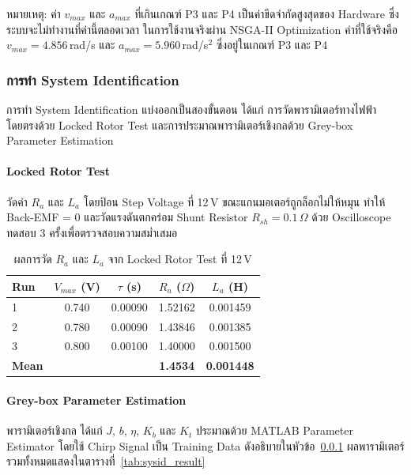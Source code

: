 หมายเหตุ: ค่า $v_{max}$ และ $a_{max}$ ที่เกินเกณฑ์ P3 และ P4
เป็นค่าขีดจำกัดสูงสุดของ Hardware ซึ่งระบบจะไม่ทำงานที่ค่านี้ตลอดเวลา
ในการใช้งานจริงผ่าน NSGA-II Optimization
ค่าที่ใช้จริงคือ $v_{max} = 4.856$\,rad/s และ $a_{max} = 5.960$\,rad/s$^2$
ซึ่งอยู่ในเกณฑ์ P3 และ P4

\subsubsection{การทำ System Identification}
\label{subsec:sysid}

การทำ System Identification แบ่งออกเป็นสองขั้นตอน
ได้แก่ การวัดพารามิเตอร์ทางไฟฟ้าโดยตรงด้วย Locked Rotor Test
และการประมาณพารามิเตอร์เชิงกลด้วย Grey-box Parameter Estimation

\paragraph{Locked Rotor Test}

วัดค่า $R_a$ และ $L_a$ โดยป้อน Step Voltage ที่ 12\,V
ขณะแกนมอเตอร์ถูกล็อกไม่ให้หมุน ทำให้ Back-EMF = 0
และวัดแรงดันตกคร่อม Shunt Resistor $R_{sh} = 0.1\,\Omega$
ด้วย Oscilloscope ทดสอบ 3 ครั้งเพื่อตรวจสอบความสม่ำเสมอ

\begin{table}[H]
  \centering
  \caption{ผลการวัด $R_a$ และ $L_a$ จาก Locked Rotor Test ที่ 12\,V}
  \label{tab:locked_rotor}
  \begin{tabular}{lcccc}
    \toprule
    Run & $V_{max}$ (V) & $\tau$ (s) & $R_a$ ($\Omega$) & $L_a$ (H) \\
    \midrule
    1 & 0.740 & 0.00090 & 1.52162 & 0.001459 \\
    2 & 0.780 & 0.00090 & 1.43846 & 0.001385 \\
    3 & 0.800 & 0.00100 & 1.40000 & 0.001500 \\
    \midrule
    \textbf{Mean} & & & \textbf{1.4534} & \textbf{0.001448} \\
    \bottomrule
  \end{tabular}
\end{table}

\paragraph{Grey-box Parameter Estimation}

พารามิเตอร์เชิงกล ได้แก่ $J$, $b$, $\eta$, $K_b$ และ $K_t$
ประมาณด้วย MATLAB Parameter Estimator โดยใช้
Chirp Signal เป็น Training Data ดังอธิบายในหัวข้อ~\ref{subsec:sysid}
ผลพารามิเตอร์รวมทั้งหมดแสดงในตารางที่~\ref{tab:sysid_result}

